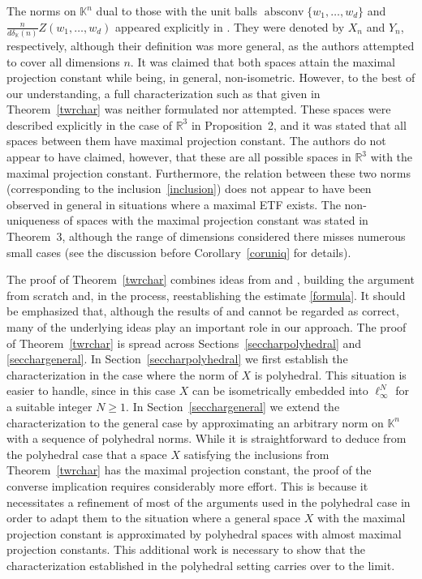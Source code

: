 \documentclass[12pt, reqno]{amsart}
\theoremstyle{definition}
\theoremstyle{remark}
\numberwithin{equation}{section}
\DeclareMathOperator{\absconv}{absconv}
\begin{document}
The norms on $\mathbb{K}^n$ dual to those with the unit balls $\absconv \{w_1, \ldots, w_d\}$ and $\frac{n}{d\delta_{\mathbb{K}}(n)} Z(w_1, \ldots, w_d)$ appeared explicitly in \cite{konigtomczak2}. They were denoted by $X_n$ and $Y_n$, respectively, although their definition was more general, as the authors attempted to cover all dimensions $n$. It was claimed that both spaces attain the maximal projection constant while being, in general, non-isometric. However, to the best of our understanding, a full characterization such as that given in Theorem~\ref{twrchar} was neither formulated nor attempted. These spaces were described explicitly in the case of $\mathbb{R}^3$ in Proposition~2, and it was stated that all spaces between them have maximal projection constant. The authors do not appear to have claimed, however, that these are all possible spaces in $\mathbb{R}^3$ with the maximal projection constant. Furthermore, the relation between these two norms (corresponding to the inclusion~\eqref{inclusion}) does not appear to have been observed in general in situations where a maximal ETF exists. The non-uniqueness of spaces with the maximal projection constant was stated in Theorem~3, although the range of dimensions considered there misses numerous small cases (see the discussion before Corollary~\ref{coruniq} for details).

The proof of Theorem~\ref{twrchar} combines ideas from \cite{konigtomczak} and \cite{konigtomczak2}, building the argument from scratch and, in the process, reestablishing the estimate \eqref{formula}. It should be emphasized that, although the results of \cite{konigtomczak} and \cite{konigtomczak2} cannot be regarded as correct, many of the underlying ideas play an important role in our approach. The proof of Theorem~\ref{twrchar} is spread across Sections~\ref{seccharpolyhedral} and \ref{secchargeneral}. In Section~\ref{seccharpolyhedral} we first establish the characterization in the case where the norm of $X$ is polyhedral. This situation is easier to handle, since in this case $X$ can be isometrically embedded into $\ell_{\infty}^N$ for a suitable integer $N \geq 1$. In Section~\ref{secchargeneral} we extend the characterization to the general case by approximating an arbitrary norm on $\mathbb{K}^n$ with a sequence of polyhedral norms. While it is straightforward to deduce from the polyhedral case that a space $X$ satisfying the inclusions from Theorem~\ref{twrchar} has the maximal projection constant, the proof of the converse implication requires considerably more effort. This is because it necessitates a refinement of most of the arguments used in the polyhedral case in order to adapt them to the situation where a general space $X$ with the maximal projection constant is approximated by polyhedral spaces with almost maximal projection constants. This additional work is necessary to show that the characterization established in the polyhedral setting carries over to the limit.
\end{document}
